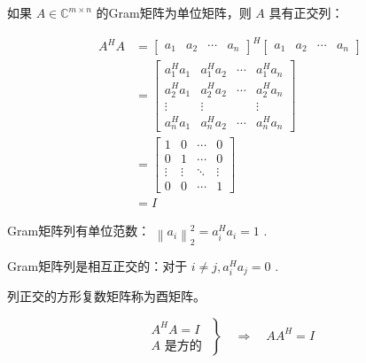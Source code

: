 \begin{definition}[复数域的Gram矩阵]
    如果 $ A \in \mathbb{C}^{m \times n} $ 的Gram矩阵为单位矩阵，则 $ A $ 具有正交列：

\begin{equation}
\begin{aligned}
A^{H} A&=\left[\begin{array}{lllll}
a_{1} & a_{2} & \cdots & a_{n}
\end{array}\right]^{H}\left[\begin{array}{lccc}
a_{1} & a_{2} & \cdots & a_{n}
\end{array}\right] \\
&=\left[\begin{array}{cccc}
a_{1}^{H} a_{1} & a_{1}^{H} a_{2} & \cdots & a_{1}^{H} a_{n} \\
a_{2}^{H} a_{1} & a_{2}^{H} a_{2} & \cdots & a_{2}^{H} a_{n} \\
\vdots & \vdots & & \vdots \\
a_{n}^{H} a_{1} & a_{n}^{H} a_{2} & \cdots & a_{n}^{H} a_{n}
\end{array}\right] \\
&=\left[\begin{array}{cccc}
1 & 0 & \cdots & 0 \\
0 & 1 & \cdots & 0 \\
\vdots & \vdots & \ddots & \vdots \\
0 & 0 & \cdots & 1
\end{array}\right]
\\ &=I
\end{aligned}
\end{equation}
\end{definition}

Gram矩阵列有单位范数： $ \left\|a_{i}\right\|_{2}^{2}=a_{i}^{H} a_{i}=1 $ .

Gram矩阵列是相互正交的：对于 $ i \neq j, a_{i}^{H} a_{j}=0 $ .

\begin{definition}[酉矩阵]
    列正交的方形复数矩阵称为酉矩阵。
\end{definition}

\begin{definition}[酉矩阵的逆]
    \begin{equation} \left.\begin{array}{c}A^{H} A=I \\ A \text { 是方的 }\end{array}\right\} \quad \Rightarrow \quad A A^{H}=I \end{equation}
\end{definition}

